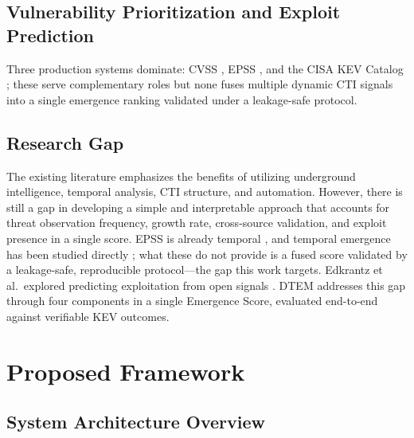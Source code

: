 \documentclass[conference]{IEEEtran}
\begin{document}
\subsection{Vulnerability Prioritization and Exploit Prediction}

Three production systems dominate: CVSS \cite{cvss}, EPSS \cite{epss}, and the CISA KEV Catalog \cite{kev_catalog}; these serve complementary roles but none fuses multiple dynamic CTI signals into a single emergence ranking validated under a leakage-safe protocol.

\subsection{Research Gap}

The existing literature emphasizes the benefits of utilizing underground intelligence, temporal analysis, CTI structure, and automation. However, there is still a gap in developing a simple and interpretable approach that accounts for threat observation frequency, growth rate, cross-source validation, and exploit presence in a single score. EPSS is already temporal \cite{epss}, and temporal emergence has been studied directly \cite{dgef, temporal_cti}; what these do not provide is a fused score validated by a leakage-safe, reproducible protocol---the gap this work targets. Edkrantz et al.\ explored predicting exploitation from open signals \cite{edkrantz_predicting}. DTEM addresses this gap through four components in a single Emergence Score, evaluated end-to-end against verifiable KEV outcomes.

\section{Proposed Framework}

\subsection{System Architecture Overview}
\end{document}
